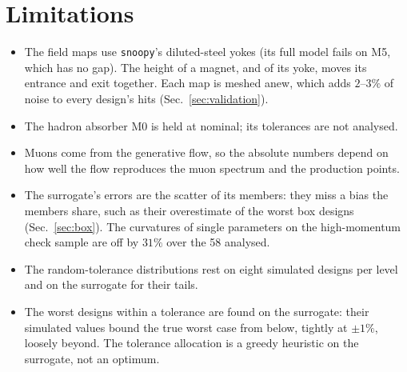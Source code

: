 \documentclass[11pt,a4paper]{article}
\begin{document}
\section*{Limitations}
\begin{itemize}
  \item The field maps use \texttt{snoopy}'s diluted-steel yokes (its full model fails on M5,
        which has no gap). The height of a magnet, and of its yoke, moves its entrance and exit
        together. Each map is meshed anew, which adds $2$--$3\%$ of noise to every design's hits
        (Sec.~\ref{sec:validation}).
  \item The hadron absorber M0 is held at nominal; its tolerances are not analysed.
  \item Muons come from the generative flow, so the absolute numbers depend on how well the flow
        reproduces the muon spectrum and the production points.
  \item The surrogate's errors are the scatter of its members: they miss a bias the members
        share, such as their overestimate of the worst box designs (Sec.~\ref{sec:box}). The
        curvatures of single parameters on the high-momentum check sample are off by $31\%$
        over the 58 analysed.
  \item The random-tolerance distributions rest on eight simulated designs per level and on the
        surrogate for their tails.
  \item The worst designs within a tolerance are found on the surrogate: their simulated values
        bound the true worst case from below, tightly at $\pm1\%$, loosely beyond. The
        tolerance allocation is a greedy heuristic on the surrogate, not an optimum.
\end{itemize}

\clearpage
\appendix
\end{document}
